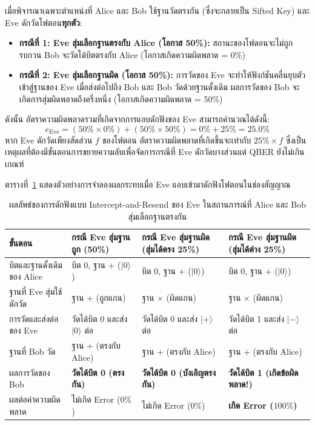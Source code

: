 เมื่อพิจารณาเฉพาะตำแหน่งที่ Alice และ Bob ใช้ฐานวัดตรงกัน (ซึ่งจะกลายเป็น Sifted Key) และ Eve ดักวัดโฟตอน\textbf{ทุกตัว}:
\begin{itemize}
    \item \textbf{กรณีที่ 1: Eve สุ่มเลือกฐานตรงกับ Alice (โอกาส 50\%):} สถานะของโฟตอนจะไม่ถูกรบกวน Bob จะวัดได้บิตตรงกับ Alice (โอกาสเกิดความผิดพลาด = 0\%)
    \item \textbf{กรณีที่ 2: Eve สุ่มเลือกฐานผิด (โอกาส 50\%):} การวัดของ Eve จะทำให้ฟังก์ชันคลื่นยุบตัวเข้าสู่ฐานของ Eve เมื่อส่งต่อไปถึง Bob และ Bob วัดด้วยฐานดั้งเดิม ผลการวัดของ Bob จะเกิดการสุ่มผิดพลาดถึงครึ่งหนึ่ง (โอกาสเกิดความผิดพลาด = 50\%)
\end{itemize}
ดังนั้น อัตราความผิดพลาดรวมที่เกิดจากการแอบดักฟังของ Eve สามารถคำนวณได้ดังนี้:
\begin{equation}
    e_{\text{Eve}} = (50\% \times 0\%) + (50\% \times 50\%) = 0\% + 25\% = \mathbf{25.0\%}
\end{equation}
หาก Eve ดักวัดเพียงสัดส่วน $f$ ของโฟตอน อัตราความผิดพลาดที่เกิดขึ้นจะเท่ากับ $25\% \times f$ ซึ่งเป็นเหตุผลที่ต้องมีขั้นตอนการขยายความลับเพื่อจัดการกรณีที่ Eve ดักวัดบางส่วนแต่ QBER ยังไม่เกินเกณฑ์

ตารางที่~\ref{tab:intercept_resend_example} แสดงตัวอย่างการจำลองผลกระทบเมื่อ Eve แอบเข้ามาดักฟังโฟตอนในช่องสัญญาณ

\begin{table}[htbp]
\centering
\renewcommand{\arraystretch}{1.35}
\setlength{\extrarowheight}{2.5pt}
\begin{tabularx}{\textwidth}{>{\raggedright\arraybackslash}p{3.2cm} >{\raggedright\arraybackslash}X >{\raggedright\arraybackslash}X >{\raggedright\arraybackslash}X}
\hline
\textbf{ขั้นตอน} & \textbf{กรณี Eve สุ่มฐานถูก (50\%)} & \textbf{กรณี Eve สุ่มฐานผิด (สุ่มได้ตรง 25\%)} & \textbf{กรณี Eve สุ่มฐานผิด (สุ่มได้ต่าง 25\%)} \\ \hline
\rowcolor{white}
บิตและฐานดั้งเดิมของ Alice & บิต 0, ฐาน $+$ ($|0\rangle$) & บิต 0, ฐาน $+$ ($|0\rangle$) & บิต 0, ฐาน $+$ ($|0\rangle$) \\
\rowcolor[HTML]{E4E7EB}
ฐานที่ Eve สุ่มใช้ดักวัด & ฐาน $+$ (ถูกแกน) & ฐาน $\times$ (ผิดแกน) & ฐาน $\times$ (ผิดแกน) \\
\rowcolor{white}
การวัดและส่งต่อของ Eve & วัดได้บิต 0 และส่ง $|0\rangle$ ต่อ & วัดได้บิต 0 และส่ง $|+\rangle$ ต่อ & วัดได้บิต 1 และส่ง $|-\rangle$ ต่อ \\
\rowcolor[HTML]{E4E7EB}
ฐานที่ Bob วัด & ฐาน $+$ (ตรงกับ Alice) & ฐาน $+$ (ตรงกับ Alice) & ฐาน $+$ (ตรงกับ Alice) \\
\rowcolor{white}
ผลการวัดของ Bob & \textbf{วัดได้บิต 0 (ตรงกัน)} & \textbf{วัดได้บิต 0 (บังเอิญตรงกัน)} & \textbf{วัดได้บิต 1 (เกิดข้อผิดพลาด!)} \\
\rowcolor[HTML]{E4E7EB}
ผลต่อค่าความผิดพลาด & ไม่เกิด Error ($0\%$) & ไม่เกิด Error ($0\%$) & \textbf{เกิด Error ($100\%$)} \\ \hline
\end{tabularx}
\caption{ผลลัพธ์ของการดักฟังแบบ Intercept-and-Resend ของ Eve ในสถานการณ์ที่ Alice และ Bob สุ่มเลือกฐานตรงกัน}
\label{tab:intercept_resend_example}
\end{table}

